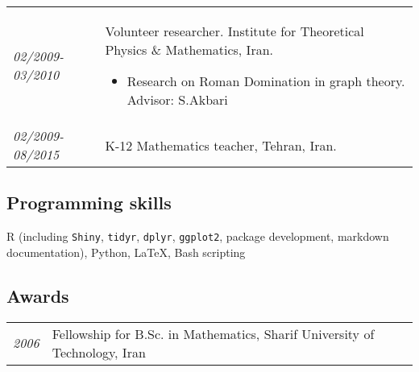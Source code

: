 \documentclass[11pt]{article}
\newcommand{\place}[1]{{\sc #1}}
\newcommand{\entry}[2]{{\emph{#1}}&{ #2 }\\[0.22cm]}
\begin{document}
\begin{longtable}{@{}p{1.5cm}p{14.5cm}}
\entry{02/2009-03/2010}{Volunteer researcher. \place{Institute for Theoretical Physics \& Mathematics}, Iran.  
 \begin{itemize}
\vspace{-0.25cm}
\item Research on Roman Domination in graph theory. \newline Advisor: S.Akbari 
\end{itemize}
 }
 
 
\entry{02/2009-08/2015}{K-12 Mathematics teacher, Tehran, Iran.  
} 


\end{longtable}

\subsection*{Programming skills}
\vspace{-.25cm}

R (including {\tt Shiny}, {\tt tidyr}, {\tt dplyr}, {\tt ggplot2}, package development, markdown documentation), Python,  \LaTeX, Bash scripting

\subsection*{Awards}
\vspace{-.6cm}
\begin{tabular}{@{}p{1.5cm}p{14.5cm}}
\entry{2006}{Fellowship for B.Sc. in Mathematics, \place{Sharif University of Technology}, Iran}
\end{tabular}


\end{document}
